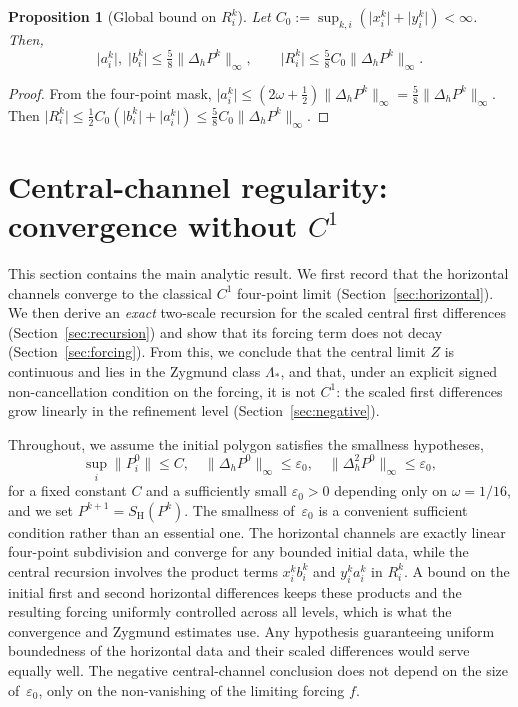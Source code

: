 \documentclass{article}
\theoremstyle{plain}
\newtheorem{proposition}[theorem]{Proposition}
\theoremstyle{definition}
\newcommand{\SH}{S_{\mathrm{H}}}
\newcommand{\norm}[1]{\lVert #1 \rVert}
\newcommand{\abs}[1]{\lvert #1 \rvert}
\newcommand{\Dh}{\Delta_h}
\newcommand{\Dhh}{\Delta_h^2}
\begin{document}
\begin{proposition}[Global bound on $R_i^k$]\label{prop:correctionbounds}
Let $C_0:=\sup_{k,i}(\abs{x_i^k}+\abs{y_i^k})<\infty$. Then,
\begin{equation}\label{eq:globalbound}
  \abs{a_i^k},\;\abs{b_i^k} \leq \tfrac{5}{8}\norm{\Dh P^k}_\infty, \qquad
  \abs{R_i^k} \leq \tfrac{5}{8}C_0\norm{\Dh P^k}_\infty.
\end{equation}
\end{proposition}

\begin{proof}
From the four-point mask,
$\abs{a_i^k}\leq(2\omega+\tfrac{1}{2})\norm{\Dh P^k}_\infty
=\tfrac{5}{8}\norm{\Dh P^k}_\infty$.
Then $\abs{R_i^k}\leq\tfrac{1}{2}C_0(\abs{b_i^k}+\abs{a_i^k})
\leq\tfrac{5}{8}C_0\norm{\Dh P^k}_\infty$.
\end{proof}



\section{Central-channel regularity: convergence without $C^1$}\label{sec:convergence}

This section contains the main analytic result. We first record that the
horizontal channels converge to the classical $C^1$ four-point limit
(Section~\ref{sec:horizontal}). We then derive an \emph{exact} two-scale
recursion for the scaled central first differences
(Section~\ref{sec:recursion}) and show that its forcing term does not decay
(Section~\ref{sec:forcing}). From this, we conclude that the central limit
$Z$ is continuous and lies in the Zygmund class $\Lambda_*$, and that, under an
explicit signed non-cancellation condition on the forcing, it is not $C^1$: the
scaled first differences grow linearly in the refinement level
(Section~\ref{sec:negative}).

Throughout, we assume the initial polygon satisfies the smallness hypotheses,
\begin{equation}\label{eq:hyp}
  \sup_i\norm{P_i^0}\leq C,\quad
  \norm{\Dh P^0}_\infty\leq\varepsilon_0,\quad
  \norm{\Dhh P^0}_\infty\leq\varepsilon_0,
\end{equation}
for a fixed constant $C$ and a sufficiently small $\varepsilon_0>0$ depending
only on $\omega=1/16$, and we set $P^{k+1}=\SH(P^k)$. The smallness
of~$\varepsilon_0$ is a convenient sufficient condition rather than an essential
one. The horizontal channels are exactly linear four-point subdivision and
converge for any bounded initial data, while the central recursion involves the
product terms $x_i^k b_i^k$ and $y_i^k a_i^k$ in $R_i^k$. A bound on the initial
first and second horizontal differences keeps these products and the resulting
forcing uniformly controlled across all levels, which is what the convergence and
Zygmund estimates use. Any hypothesis guaranteeing uniform boundedness of the
horizontal data and their scaled differences would serve equally well. The
negative central-channel conclusion does not depend on the size
of~$\varepsilon_0$, only on the non-vanishing of the limiting forcing $f$.
\end{document}
